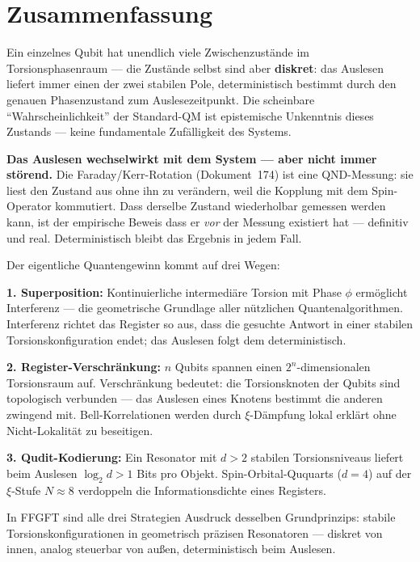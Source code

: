 \section{Zusammenfassung}
\label{sec:zusammenfassung-175}

\begin{conclusionBox}
Ein einzelnes Qubit hat unendlich viele Zwischenzustände
im Torsionsphasenraum --- die Zustände selbst sind aber
\textbf{diskret}: das Auslesen liefert immer einen der
zwei stabilen Pole, deterministisch bestimmt durch den
genauen Phasenzustand zum Auslesezeitpunkt.
Die scheinbare ``Wahrscheinlichkeit'' der Standard-QM
ist epistemische Unkenntnis dieses Zustands ---
keine fundamentale Zufälligkeit des Systems.

\textbf{Das Auslesen wechselwirkt mit dem System ---
aber nicht immer störend.}
Die Faraday/Kerr-Rotation (Dokument~174) ist eine
QND-Messung: sie liest den Zustand aus ohne ihn zu verändern,
weil die Kopplung mit dem Spin-Operator kommutiert.
Dass derselbe Zustand wiederholbar gemessen werden kann,
ist der empirische Beweis dass er \emph{vor} der Messung
existiert hat --- definitiv und real.
Deterministisch bleibt das Ergebnis in jedem Fall.

Der eigentliche Quantengewinn kommt auf drei Wegen:

\textbf{1. Superposition:}
Kontinuierliche intermediäre Torsion mit Phase $\phi$
ermöglicht Interferenz --- die geometrische Grundlage
aller nützlichen Quantenalgorithmen.
Interferenz richtet das Register so aus, dass
die gesuchte Antwort in einer stabilen Torsionskonfiguration
endet; das Auslesen folgt dem deterministisch.

\textbf{2. Register-Verschränkung:}
$n$ Qubits spannen einen $2^n$-dimensionalen Torsionsraum auf.
Verschränkung bedeutet: die Torsionsknoten der Qubits
sind topologisch verbunden --- das Auslesen eines
Knotens bestimmt die anderen zwingend mit.
Bell-Korrelationen werden durch $\xi$-Dämpfung
lokal erklärt ohne Nicht-Lokalität zu beseitigen.

\textbf{3. Qudit-Kodierung:}
Ein Resonator mit $d > 2$ stabilen Torsionsniveaus
liefert beim Auslesen $\log_2 d > 1$ Bits pro Objekt.
Spin-Orbital-Ququarts ($d = 4$) auf der
$\xi$-Stufe $N \approx 8$ verdoppeln die
Informationsdichte eines Registers.

In FFGFT sind alle drei Strategien Ausdruck desselben
Grundprinzips: stabile Torsionskonfigurationen
in geometrisch präzisen Resonatoren --- diskret von innen,
analog steuerbar von außen, deterministisch beim Auslesen.
\end{conclusionBox}

